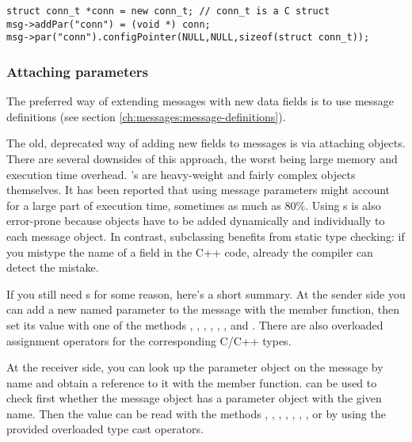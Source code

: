 \begin{verbatim}
struct conn_t *conn = new conn_t; // conn_t is a C struct
msg->addPar("conn") = (void *) conn;
msg->par("conn").configPointer(NULL,NULL,sizeof(struct conn_t));
\end{verbatim}




\subsubsection{Attaching parameters}

The preferred way of extending messages with new data fields is to use
message definitions (see section \ref{ch:messages:message-definitions}).

The old, deprecated way of adding new fields to messages is via
attaching  objects.
There are several downsides of this approach, the worst being
large memory and execution time overhead. 's are
heavy-weight and fairly complex objects themselves.
It has been reported that using  message parameters
might account for a large part of execution time, sometimes as much as 80\%.
Using s is also error-prone because  objects
have to be added dynamically and individually to each message object.
In contrast, subclassing benefits from static type checking:
if you mistype the name of a field in the C++ code, already the compiler
can detect the mistake.

If you still need s for some reason, here's a short summary.
At the sender side you can add a new named parameter to the message
with the  member function, then set its value with
one of the methods , ,
, , ,
, and . There are also overloaded
assignment operators for the corresponding C/C++ types.

At the receiver side, you can look up the parameter object on the message
by name and obtain a reference to it with the  member function.
 can be used to check first whether the message object has a parameter
object with the given name. Then the value can be read with the methods
, , ,
, , ,
, or by using the provided overloaded type cast operators.

